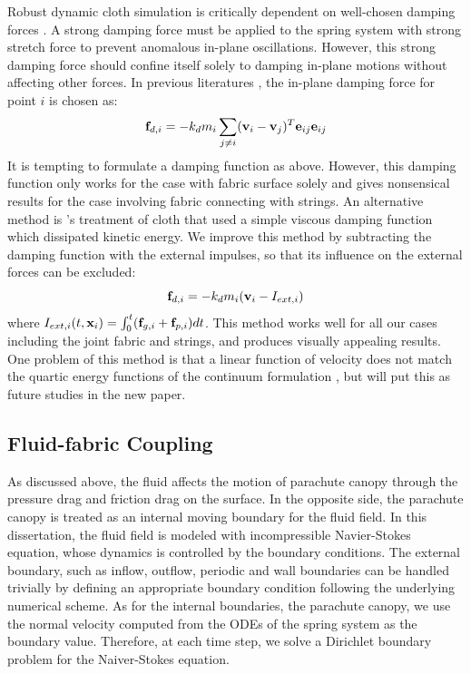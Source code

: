 Robust dynamic cloth simulation is critically dependent on well-chosen damping forces \cite{}. A strong damping force must be applied to the spring system with strong stretch force to prevent anomalous in-plane oscillations. However, this strong damping force should confine itself solely to damping in-plane motions without affecting other forces. In previous literatures \cite{}, the in-plane damping force for point $i$ is chosen as:
\begin{equation}
\mathbf{f}_{d,i} = -k_d m_i\sum_{j \neq i}(\mathbf{v}_i - \mathbf{v}_j)^T\mathbf{e}_{ij}\mathbf{e}_{ij}
\label{eq:damping_1} 
\end{equation}
It is tempting to formulate a damping function as above. However, this damping function only works for the case with fabric surface solely and gives nonsensical results for the case involving fabric connecting with strings. An alternative method is \cite{Terzopoulos87, Terzopoulos88, Carignan1992, Platt1988}'s treatment of cloth that used a simple viscous damping function which dissipated kinetic energy. We improve this method by subtracting the damping function with the external impulses, so that its influence on the external forces can be excluded:
\begin{equation}
\mathbf{f}_{d,i} = -k_d m_i(\mathbf{v}_i-I_{ext,i})
\end{equation}
where $I_{ext,i}(t,\mathbf{x}_i) = \int_0^t (\mathbf{f}_{g,i} + \mathbf{f}_{p,i}) dt$.
This method works well for all our cases including the joint fabric and strings, and produces visually appealing results. One problem of this method is that a linear function of velocity does not match the quartic energy functions of the continuum formulation \cite{Baraff1998}, but will put this as future studies in the new paper.
 
\subsection{Fluid-fabric Coupling}
As discussed above, the fluid affects the motion of parachute canopy through the pressure drag and friction drag on the surface. In the opposite side, the parachute canopy is treated as an internal moving boundary for the fluid field. In this dissertation, the fluid field is modeled with incompressible Navier-Stokes equation, whose dynamics is controlled by the boundary conditions. The external boundary, such as inflow, outflow, periodic and wall boundaries can be handled trivially by defining an appropriate boundary condition following the underlying numerical scheme. As for the internal boundaries, the parachute canopy, we use the normal velocity computed from the ODEs of the spring system as the boundary value. Therefore, at each time step, we solve a Dirichlet boundary problem for the Naiver-Stokes equation.

